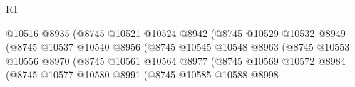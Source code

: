 \begin{lexlean}{R1}
\begin{coremodule}
                                                      @10516
                                                      @8935
                                                      (@8745
                                                        @10521
                                                        @10524
                                                        @8942
                                                        (@8745
                                                          @10529
                                                          @10532
                                                          @8949
                                                          (@8745
                                                            @10537
                                                            @10540
                                                            @8956
                                                            (@8745
                                                              @10545
                                                              @10548
                                                              @8963
                                                              (@8745
                                                                @10553
                                                                @10556
                                                                @8970
                                                                (@8745
                                                                  @10561
                                                                  @10564
                                                                  @8977
                                                                  (@8745
                                                                    @10569
                                                                    @10572
                                                                    @8984
                                                                    (@8745
                                                                      @10577
                                                                      @10580
                                                                      @8991
                                                                      (@8745
                                                                        @10585
                                                                        @10588
                                                                        @8998

\end{coremodule}
\end{lexlean}
